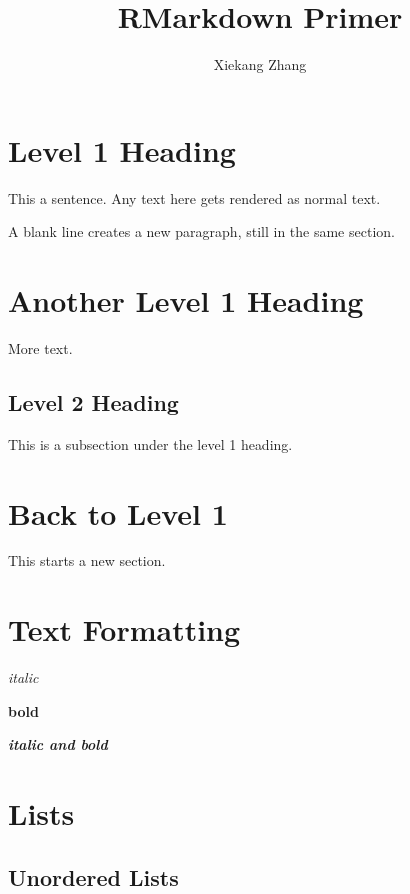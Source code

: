 \documentclass[
]{article}
\title{RMarkdown Primer}
\author{Xiekang Zhang}
\date{}
\begin{document}
\maketitle

{
\setcounter{tocdepth}{2}
\tableofcontents
}
\hypertarget{level-1-heading}{%
\section{Level 1 Heading}\label{level-1-heading}}

This a sentence. Any text here gets rendered as normal text.

A blank line creates a new paragraph, still in the same section.

\hypertarget{another-level-1-heading}{%
\section{Another Level 1 Heading}\label{another-level-1-heading}}

More text.

\hypertarget{level-2-heading}{%
\subsection{Level 2 Heading}\label{level-2-heading}}

This is a subsection under the level 1 heading.

\hypertarget{back-to-level-1}{%
\section{Back to Level 1}\label{back-to-level-1}}

This starts a new section.

\hypertarget{text-formatting}{%
\section{Text Formatting}\label{text-formatting}}

\emph{italic}

\textbf{bold}

\textbf{\emph{italic and bold}}

\hypertarget{TheLists}{%
\section{Lists}\label{TheLists}}

\hypertarget{unordered-lists}{%
\subsection{Unordered Lists}\label{unordered-lists}}
\end{document}
